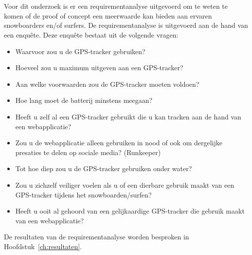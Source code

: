 \section{}
\label{ch:requirementAnalyse}
Voor dit onderzoek is er een requirementanalyse uitgevoerd om te weten te komen of de proof of concept een meerwaarde kan bieden aan ervaren snowboarders en/of surfers. De requirementanalyse is uitgevoerd aan de hand van een enquête. Deze enquête bestaat uit de volgende vragen:
\begin{itemize}
	\item Waarvoor zou u de GPS-tracker gebruiken?
	\item Hoeveel zou u maximum uitgeven aan een GPS-tracker?
	\item Aan welke voorwaarden zou de GPS-tracker moeten voldoen?
	\item Hoe lang moet de batterij minstens meegaan?
	\item Heeft u zelf al een GPS-tracker gebruikt die u kan tracken aan de hand van een webapplicatie?
	\item Zou u de webapplicatie alleen gebruiken in nood of ook om dergelijke presaties te delen op sociale media? (Runkeeper)
	\item Tot hoe diep zou u de GPS-tracker gebruiken onder water?
	\item Zou u zichzelf veiliger voelen als u of een dierbare gebruik maakt van een GPS-tracker tijdens het snowboarden/surfen?
	\item Heeft u ooit al gehoord van een gelijkaardige GPS-tracker die gebruik maakt van een webapplicatie?
\end{itemize}
De resultaten van de requirementanalyse worden besproken in Hoofdstuk~\ref{ch:resultaten}.


